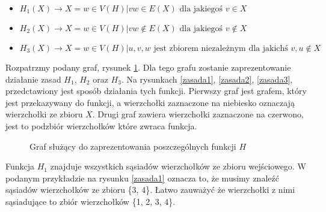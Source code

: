 \begin{itemize}
    
  \item   $H_1(X) \to X = { w \in V(H) | vw \in E(X) \textrm{ dla jakiegoś } v \in X }$ 
  
  \item   $H_2(X) \to X = { w \in V(H) | vw \notin E(X) \textrm{ dla jakiegoś } v \notin X}$
  
  \item   $H_3(X) \to X = { w \in V(H) | { u, v, w } \textrm{ jest zbiorem niezależnym dla jakichś } v, u \notin X}$ 
\end{itemize}


Rozpatrzmy podany graf, rysunek \ref{zasada0}. Dla tego grafu zostanie zaprezentowanie działanie zasad  $H_1$,  $H_2$ oraz  $H_3$. Na rysunkach \ref{zasada1}, \ref{zasada2}, \ref{zasada3}, przedctawiony jest sposób działania tych funkcji. Pierwszy graf jest grafem, który jest przekazywany do funkcji, a wierzchołki zaznaczone na niebiesko oznaczają wierzchołki ze zbioru $X$. Drugi graf zawiera wierzchołki zaznaczone na czerwono, jest to podzbiór wierzchołków które zwraca funkcja.


 \begin{figure}[H]
  \centering
    \caption{Graf służący do zaprezentowania poszczególnych funkcji $H$}
 \label{zasada0}
 \end{figure}

Funkcja $H_1$ znajduje wszystkich sąsiadów wierzchołków ze zbioru wejściowego. W podanym przykładzie na rysunku \ref{zasada1} oznacza to, że musimy znaleźć sąsiadów wierzchołków ze zbioru \{3, 4\}. Łatwo zauważyć że wierzchołki z nimi sąsiadujące to zbiór wierzchołków \{1, 2, 3, 4\}.

